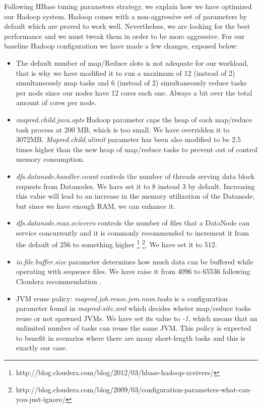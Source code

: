 Following HBase tuning parameters strategy, we explain how we have optimized our Hadoop system. Hadoop comes with a non-aggressive set of parameters by default which are proved to work well. Nevertheless, we are looking for the best performance and we must tweak them in order to be more aggressive. For our baseline Hadoop configuration we have made a few changes, exposed below: 
\begin{itemize}
\item The default number of map/Reduce slots is not adequate for our workload, that is why we have modified it to run a maximum of 12 (instead of 2) simultaneously map tasks and 6 (instead of 2) simultaneously reduce tasks per node since our nodes have 12 cores each one. Always a bit over the total amount of cores per node.
\item \textit{mapred.child.java.opts} Hadoop parameter caps the heap of each map/reduce task process at 200 MB, which is too small. We have overridden it to 3072MB. \textit{Mapred.child.ulimit} parameter has been also modified to be 2.5 times higher than the new heap of map/reduce tasks to prevent out of control memory consumption.
\item \textit{dfs.datanode.handler.count} controls the number of threads serving data block requests from Datanodes. We have set it to 8 instead 3 by default. Increasing this value will lead to an increase in the memory utilization of the Datanode, but since we have enough RAM, we can enhance it.
\item \textit{dfs.datanode.max.xcievers} controls the number of files that a DataNode can service concurrently and it is commonly recommended to increment it from the default of 256 to something higher \footnote{http://blog.cloudera.com/blog/2012/03/hbase-hadoop-xceivers/}  \footnote{\label{1}http://blog.cloudera.com/blog/2009/03/configuration-parameters-what-can-you-just-ignore/}. We have set it to 512.
\item \textit{io.file.buffer.size} parameter determines how much data can be buffered while operating with sequence files. We have raise it from 4096 to 65536 following Cloudera recommendation \footnotemark[1].
\item JVM reuse policy: \textit{mapred.job.reuse.jvm.num.tasks} is a configuration parameter found in \textit{mapred-site.xml} which decides wheter map/reduce tasks reuse or not spawned JVMs. We have set its value to \textit{-1}, which means that an unlimited number of tasks can reuse the same JVM. This policy is expected to benefit in scenarios where there are many short-length tasks and this is exactly our case.
\end{itemize}


